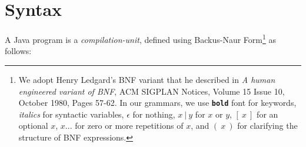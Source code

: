 \section{Syntax}

A Java program is a \emph{compilation-unit}, defined using Backus-Naur Form\footnote{
We adopt Henry Ledgard's BNF variant that he described in
\emph{A human engineered variant of BNF}, ACM SIGPLAN Notices, Volume 15 Issue 10,
October 1980, Pages 57-62. In our grammars, we use \textbf{\texttt{bold}} font for keywords,
{\it italics} for syntactic variables, $\epsilon$ for nothing,
$x\ |\ y$ for $x$ or $y$, $[\ x\ ]$ for an optional $x$,
$ x ...$ for zero or more repetitions of $x$, and $(\ x\ )$ for clarifying the structure of BNF expressions.}
as follows:
